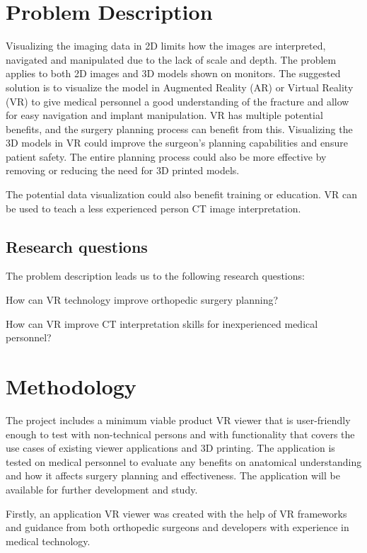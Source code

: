 \documentclass[a4paper]{report}
\begin{document}
\section{Problem Description}
Visualizing the imaging data in 2D limits how the images are interpreted, navigated and manipulated due to the lack of scale and depth. The problem applies to both 2D images and 3D models shown on monitors.
The suggested solution is to visualize the model in Augmented Reality (AR) or Virtual Reality (VR) to give medical personnel a good understanding of the fracture and allow for easy navigation and implant manipulation.
VR has multiple potential benefits, and the surgery planning process can benefit from this.
Visualizing the 3D models in VR could improve the surgeon's planning capabilities and ensure patient safety.
The entire planning process could also be more effective by removing or reducing the need for 3D printed models.

The potential data visualization could also benefit training or education. VR can be used to teach a less experienced person CT image interpretation.

\subsection{Research questions}
The problem description leads us to the following research questions:

How can VR technology improve orthopedic surgery planning?

How can VR improve CT interpretation skills for inexperienced medical personnel?

\section{Methodology}

The project includes a minimum viable product VR viewer that is user-friendly enough to test with non-technical persons and with functionality that covers the use cases of existing viewer applications and 3D printing.
The application is tested on medical personnel to evaluate any benefits on anatomical understanding and how it affects surgery planning and effectiveness. The application will be available for further development and study.

Firstly, an application VR viewer was created with the help of VR frameworks and guidance from both orthopedic surgeons and developers with experience in medical technology.
\end{document}
